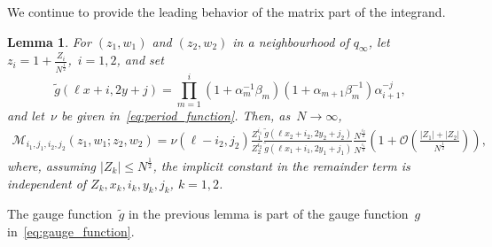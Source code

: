 \documentclass[11pt]{article}
\theoremstyle{plain}
\newtheorem{lemma}[theorem]{Lemma}
\theoremstyle{definition}
\numberwithin{equation}{section}
\newcommand{\Ordo}{\mathcal{O}}
\begin{document}
We continue to provide the leading behavior of the matrix part of the integrand.
\begin{lemma}\label{lem:matrix_local}
For $(z_1,w_1)$ and $(z_2,w_2)$ in a neighbourhood of $q_{\infty}$, let
~$z_i=1+\frac{Z_i}{N^\frac{1}{2}}$,~$i=1,2$, and set
\begin{equation}
\tilde g(\ell x+i,2y+j)=\prod_{m=1}^i(1+\alpha_m^{-1}\beta_m)(1+\alpha_{m+1}\beta_m^{-1})\alpha_{i+1}^{-j},
\end{equation}
and let~$\nu$ be given in~\eqref{eq:period_function}. Then, as~$N\to \infty$, 
\begin{multline} \label{eqn:matrix_precise}
\boldsymbol{\mathcal{M}}_{i_1,j_1,i_2,j_2}\left(z_1,w_1;z_2,w_2\right)
%
= \nu(\ell-i_2,j_2)\frac{Z_1^{i_1}}{Z_2^{i_2}}\frac{\tilde g(\ell x_2+i_2,2y_2+j_2)}{\tilde g(\ell x_1+i_1,2y_1+j_1)}\frac{N^{\frac{i_2}{2}}}{N^{\frac{i_1}{2}}}\left(1+\Ordo\left(\frac{|Z_1|+|Z_2|}{N^{\frac{1}{2}}}\right)\right),
\end{multline}
where, assuming $|Z_k|\leq N^{\frac{1}{2}}$, the implicit constant in the remainder term is independent of $Z_k, x_k, i_k, y_k, j_k$, $k=1,2$.
\end{lemma}
The gauge function~$\tilde g$ in the previous lemma is part of the gauge function~$g$ in~\eqref{eq:gauge_function}.
\end{document}

